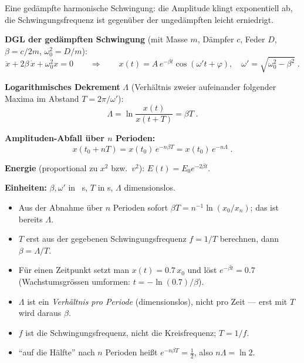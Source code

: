 

Eine gedämpfte harmonische Schwingung: die Amplitude klingt exponentiell ab,
die Schwingungsfrequenz ist gegenüber der ungedämpften leicht erniedrigt.

\begin{werkzeugkasten}[Werkzeuge]
\textbf{DGL der gedämpften Schwingung} (mit Masse $m$, Dämpfer $c$, Feder $D$,
$\beta=c/2m$, $\omega_0^2=D/m$):
\begin{equation}
  \ddot x + 2\beta\,\dot x + \omega_0^2 x = 0
  \qquad\Rightarrow\qquad
  x(t)=A\,e^{-\beta t}\cos(\omega' t+\varphi), \quad
  \omega'=\sqrt{\omega_0^2-\beta^2}\;.
\end{equation}

\textbf{Logarithmisches Dekrement} $\Lambda$ (Verhältnis zweier aufeinander
folgender Maxima im Abstand $T=2\pi/\omega'$):
\begin{equation}
  \Lambda=\ln\frac{x(t)}{x(t+T)}=\beta T\;.
\end{equation}

\textbf{Amplituden-Abfall über $n$ Perioden:}
\begin{equation}
  x(t_0+nT)=x(t_0)\,e^{-n\beta T}=x(t_0)\,e^{-n\Lambda}\;.
\end{equation}

\textbf{Energie} (proportional zu $x^2$ bzw.\ $v^2$): $E(t)=E_0e^{-2\beta t}$.

\textbf{Einheiten:} $\beta,\omega'$ in \unit{\per\second}, $T$ in
\unit{\second}, $\Lambda$ dimensionslos.
\end{werkzeugkasten}

\begin{werkzeugkasten}[Vorgehen]
\begin{itemize}
  \item Aus der Abnahme über $n$ Perioden sofort $\beta T=n^{-1}\ln(x_0/x_n)$;
       das ist bereits $\Lambda$.
  \item $T$ erst aus der gegebenen Schwingungsfrequenz $f=1/T$ berechnen, dann
       $\beta=\Lambda/T$.
  \item Für einen Zeitpunkt setzt man $x(t)=0.7\,x_0$ und löst
       $e^{-\beta t}=0.7$ (Wachstumsgrössen umformen: $t=-\ln(0.7)/\beta$).
\end{itemize}
\end{werkzeugkasten}

\begin{achtung}
\begin{itemize}
  \item $\Lambda$ ist ein \emph{Verhältnis pro Periode} (dimensionslos), nicht
       pro Zeit --- erst mit $T$ wird daraus $\beta$.
  \item $f$ ist die Schwingungsfrequenz, nicht die Kreisfrequenz; $T=1/f$.
  \item ``auf die Hälfte'' nach $n$ Perioden hei\ss t
       $e^{-n\beta T}=\tfrac12$, also $n\Lambda=\ln 2$.
\end{itemize}
\end{achtung}

